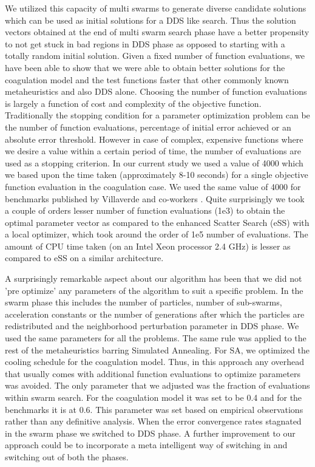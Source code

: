 \documentclass[12pt]{article}
\begin{document}
We utilized this capacity of multi swarms to generate diverse candidate solutions which can be used as initial solutions for a DDS like search. Thus the solution vectors obtained at the end of multi swarm search phase have a better propensity to not get stuck in bad regions in DDS phase as opposed to starting with a totally random initial solution. Given a fixed number of function evaluations, we have been able to show that we were able to obtain better solutions for the coagulation model and the test functions faster that other commonly known metaheuristics and also DDS alone.  Choosing the number of function evaluations is largely a function of cost and complexity of the objective function. Traditionally the stopping condition for a parameter optimization problem can be the number of function evaluations, percentage of initial error achieved or an absolute error threshold. However in case of complex, expensive functions where we desire a value within a certain period of time, the number of evaluations are used as a stopping criterion. In our current study we used a value of 4000 which we based upon the time taken (approximately 8-10 seconds) for a single objective function evaluation in the coagulation case. We used the same value of 4000 for benchmarks published by Villaverde and co-workers \cite{villaverde2015biopredyn}. Quite surprisingly we took a couple of orders lesser number of function evaluations (1e3) to obtain the optimal parameter vector as compared to the enhanced Scatter Search (eSS) with a local optimizer, which took around the order of 1e5 number of evaluations.  The amount of CPU time taken (on an Intel Xeon processor 2.4 GHz) is lesser as compared to eSS on a similar architecture.

A surprisingly remarkable aspect about our algorithm has been that we did not 'pre optimize' any parameters of the algorithm to suit a specific problem. In the swarm phase this includes the number of particles, number of sub-swarms, acceleration constants or the number of generations after which the particles are redistributed and the neighborhood perturbation parameter in DDS phase. We used the same parameters for all the problems. The same rule was applied to the rest of the metaheuristics barring Simulated Annealing. For SA, we optimized the cooling schedule for the coagulation model. Thus, in this approach any overhead that usually comes with additional function evaluations to optimize parameters was avoided. The only parameter that we adjusted was the fraction of evaluations within swarm search. For the coagulation model it was set to be 0.4 and for the benchmarks it is at 0.6. This parameter was set based on empirical observations rather than any definitive analysis. When the error convergence rates stagnated in the swarm phase we switched to DDS phase. A further improvement to our approach could  be to incorporate a meta intelligent way of switching in and switching out of both the phases.    
\end{document}
